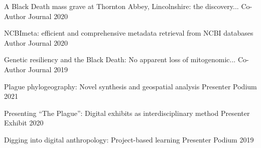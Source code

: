 

\begin{cvhonors}

  \cvhonor
    {A Black Death mass grave at Thornton Abbey, Lincolnshire: the discovery...} %
    {Co-Author} %
    {Journal} %
    {2020} %
    
  \cvhonor
    {NCBImeta: efficient and comprehensive metadata retrieval from NCBI databases} %
    {Author} %
    {Journal} %
    {2020} %

  \cvhonor
    {Genetic resiliency and the Black Death: No apparent loss of mitogenomic...} %
    {Co-Author} %
    {Journal} %
    {2019} %
                        
        
\end{cvhonors}
   


\begin{cvhonors}

  \cvhonor
    {Plague phylogeography: Novel synthesis and geospatial analysis} %
    {Presenter} %
    {Podium} %
    {2021} %
    
  \cvhonor
    {Presenting “The Plague”: Digital exhibits as interdisciplinary method} %
    {Presenter} %
    {Exhibit} %
    {2020} %
    
  \cvhonor
    {Digging into digital anthropology: Project-based learning} %
    {Presenter} %
    {Podium} %
    {2019} %



 
    
\end{cvhonors}

